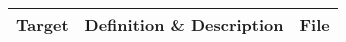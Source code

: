 
\begin{longtable}{>{\ttfamily}l X >{\ttfamily}l}
	\rowcolor{gray!50}
	\textbf{Target} & \textbf{Definition \& Description} & \textbf{File} \\
	
			
	
	\bottomrule
\end{longtable}
